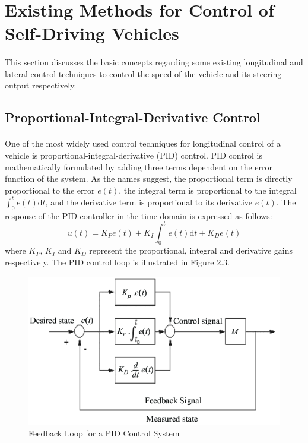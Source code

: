 \section{Existing Methods for Control of Self-Driving Vehicles}
\paragraph{}
This section discusses the basic concepts regarding some existing longitudinal and lateral control techniques to control the speed of the vehicle and its steering output respectively.

\subsection{Proportional-Integral-Derivative Control}
\paragraph{}
One of the most widely used control techniques for longitudinal control of a vehicle is proportional-integral-derivative (PID) control. PID control is mathematically formulated by adding three terms dependent on the error function of the system. As the names suggest, the proportional term is directly proportional to the error $e(t)$, the integral term is proportional to the integral $\displaystyle\int_0^te(t)\text{d}t$, and the derivative term is proportional to its derivative $\dot{e}(t)$. The response of the PID controller in the time domain is expressed as follows:
$$u(t)=K_Pe(t)+K_I\int_0^te(t)\text{d}t+K_D\dot{e}(t)$$
where $K_P$, $K_I$ and $K_D$ represent the proportional, integral and derivative gains respectively. The PID control loop is illustrated in Figure 2.3.

\begin{figure}[H]\label{fig2.3}
\centering \includegraphics[scale = 0.5]{Images/pid_control_system.png}
\caption{Feedback Loop for a PID Control System}
\end{figure}


